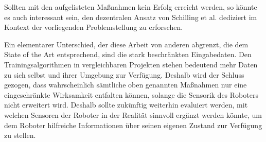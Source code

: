 Sollten mit den aufgelisteten Maßnahmen kein Erfolg erreicht werden, so könnte es auch interessant sein, den dezentralen Ansatz von Schilling et al. \cite{schilling2020decentralized} dediziert im Kontext der vorliegenden Problemstellung zu erforschen.

Ein elementarer Unterschied, der diese Arbeit von anderen abgrenzt, die dem State of the Art entsprechend, sind die stark beschränkten Eingabedaten.
Den Trainingsalgorithmen in vergleichbaren Projekten stehen bedeutend mehr Daten zu sich selbst und ihrer Umgebung zur Verfügung.
Deshalb wird der Schluss gezogen, dass wahrscheinlich sämtliche oben genannten Maßnahmen nur eine eingeschränkte Wirksamkeit entfalten können, solange die Sensorik des Roboters nicht erweitert wird.
Deshalb sollte zukünftig weiterhin evaluiert werden, mit welchen Sensoren der Roboter in der Realität sinnvoll ergänzt werden könnte, um dem Roboter hilfreiche Informationen über seinen eigenen Zustand zur Verfügung zu stellen.